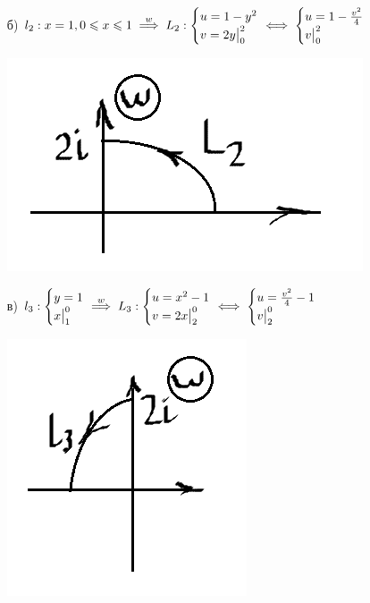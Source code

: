 \documentclass[../../main.tex]{subfiles}
\begin{document}
\begin{examples}
\begin{enumerate}
\begin{itemize}
\item[б)]
$l_2: x = 1, 0 \leq x \leq 1 \stackrel{w}{\implies}
L_2: \begin{cases}
    u = 1 - y^2\\
    v = 2y\big|_0^2
\end{cases} \hspace{-1em} \iff
\begin{cases}
    u = 1 - \frac{v^2}{4}\\
    v\big|_0^2
\end{cases}$
\begin{center}
\includegraphics[height=0.3\textwidth]{lec30_5.png}
\end{center}

\item[в)]
$l_3: 
\begin{cases}
    y = 1\\
    x\big|_1^0
\end{cases} \hspace{-1em} \stackrel{w}{\implies}
L_3:
\begin{cases}
    u = x^2 - 1\\
    v = 2x\big|_2^0
\end{cases} \hspace{-1em} \iff
\begin{cases}
    u = \frac{v^2}{4} - 1\\
    v\big|_2^0
\end{cases}$
\begin{center}
\includegraphics[height=0.3\textwidth]{lec30_6.png}
\end{center}


\end{itemize}
\end{enumerate}
\end{examples}
\end{document}
